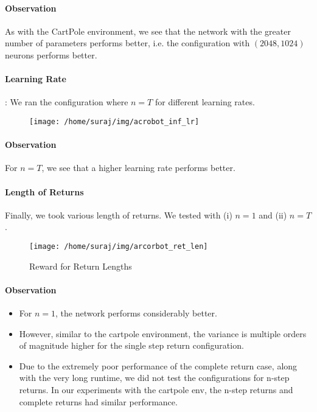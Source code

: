 \documentclass[A4]{article}
\begin{document}
    \paragraph{Observation} As with the CartPole environment, we see that the network with the greater number of parameters performs better,
    i.e. the configuration with $(2048, 1024)$ neurons performs better.

    \paragraph{Learning Rate}:
    We ran the configuration where $n=T$ for different learning rates.
    \begin{figure}[H]
        \centering
        \texttt{[image: /home/suraj/img/acrobot\_inf\_lr]}
        \caption[Reward with Learning Rate]{}
        \label{fig:}
    \end{figure}

    \paragraph{Observation} For $n=T$, we see that a higher learning rate performs better.

    \paragraph{Length of Returns} Finally, we took various length of returns.
    We tested with (i) $n=1$ and (ii) $n=T$.

    \begin{figure}[H]
        \centering
        \texttt{[image: /home/suraj/img/arcorbot\_ret\_len]}
        \caption{Reward for Return Lengths}
        \label{fig:}
    \end{figure}

    \paragraph{Observation}
    \begin{itemize}
        \item For $n=1$, the network performs considerably better.
        \item However, similar to the cartpole environment, the variance is multiple orders of magnitude higher for the single step return configuration.
        \item Due to the extremely poor performance of the complete return case, along with the very long runtime, we did not test the configurations for n-step returns.
        In our experiments with the cartpole env, the n-step returns and complete returns had similar performance.
    \end{itemize}
\end{document}
